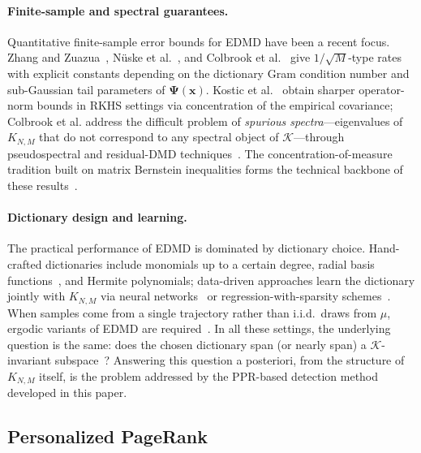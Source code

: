 \documentclass{article}
\theoremstyle{plain}
\theoremstyle{definition}
\def\x{\mathbf{x}}
\def\Koop{\mathcal{K}}
\newcommand{\arXivtag}[1][]{#1}
\begin{document}
\paragraph{Finite-sample and spectral guarantees.}
Quantitative finite-sample error bounds for EDMD have been a recent focus. Zhang and Zuazua~\cite{zhang2023quantitative}, N\"uske et al.~\cite{nuske2023finite}, and Colbrook et al.~\cite{colbrook2024rigorous} give $\arXivtag[1/\sqrt{M}]$-type rates with explicit constants depending on the dictionary Gram condition number and sub-Gaussian tail parameters of $\mathbf{\Psi}(\x)$. Kostic et al.~\cite{Kostic-NeuRips2023} obtain sharper operator-norm bounds in RKHS settings via concentration of the empirical covariance; \arXivtag[Colbrook et al.] address the difficult problem of \emph{spurious spectra}---eigenvalues of $K_{N,M}$ that do not correspond to any spectral object of $\Koop$---through pseudospectral and residual-DMD techniques~\cite{colbrook2024rigorous,colbrook2024beyond}. The concentration-of-measure tradition built on matrix Bernstein inequalities forms the technical backbone of these results~\cite{tropp2015introduction,tropp2012user}.

\paragraph{Dictionary design and learning.}
The practical performance of EDMD is dominated by dictionary choice. Hand-crafted dictionaries include monomials up to a \arXivtag[certain] degree, radial basis functions~\cite{williams2015data}, and Hermite polynomials; data-driven approaches learn the dictionary jointly with $K_{N,M}$ via neural networks~\cite{li2017extended,yeung2019learning,takeishi2017learning,wehmeyer2018time} or regression-with-sparsity schemes~\cite{brunton2016SINDy,brunton2016PLOSONE}. When samples come from a single trajectory rather than i.i.d.\ draws from $\mu$, ergodic variants of EDMD are required~\cite{arbabi2017ergodic,kawahara2016dynamic}. In all these settings, the underlying question is the same: does the chosen dictionary span (or nearly span) a $\Koop$-invariant subspace~\cite{haseli2021learning,haseli2023generalizing}? Answering this question a posteriori, from the structure of $K_{N,M}$ itself, is the problem addressed by the PPR-based detection method developed in this paper.

\subsection{Personalized PageRank}
\end{document}

